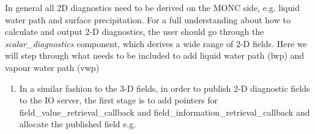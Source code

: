 \documentclass[a4paper,11pt]{article}
\begin{document}
In general all 2D diagnostics need to be derived on the MONC side, e.g.
liquid water path and surface precipitation. For a full understanding
 about how to calculate and output 2-D diagnostics, the user should go through
the \emph{scalar\_diagnostics} component, which derives a wide range of
2-D fields. Here we will step through what needs
to be included to add liquid water path (lwp) and vapour water path (vwp)
\begin{enumerate}
  \item {
  In a similar fashion to
  the 3-D fields, in order to publish 2-D diagnostic fields to the IO server, the first
  stage is to add pointers for field\_value\_retrieval\_callback and
  field\_information\_retrieval\_callback and allocate the published field e.g.

  \newpage

}
\end{enumerate}
\end{document}
